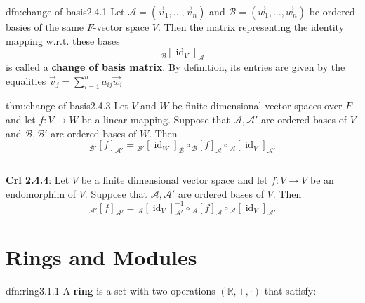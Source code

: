 \documentclass[landscape, 8pt]{extarticle}
\DeclareMathOperator{\id}{id}
\begin{document}
\begin{multicols}{3}
\begin{dfn}{dfn:change-of-basis}{2.4.1}
    Let $\mathcal{A} = (\vec{v}_{1},\dots,\vec{v}_{n})$ and $\mathcal{B} = (\vec{w}_{1},\dots,\vec{w}_{n})$ be ordered basies of the same $F$-vector space $V$. Then the matrix representing the identity mapping w.r.t. these bases
    \[{}_{\mathcal{B}}[\id_{V}]_{\mathcal{A}}\]
    is called a \textbf{change of basis matrix}. By definition, its entries are given by the equalities $\vec{v}_{j} = \sum_{i = 1}^{n} a_{ij}\vec{w}_{i}$
\end{dfn}

\begin{thm}{thm:change-of-basis}{2.4.3}
    Let $V$ and $W$ be finite dimensional vector spaces over $F$ and let $f : V \to W$ be a linear mapping. Suppose that $\mathcal{A}, \mathcal{A}'$ are ordered bases of $V$ and $\mathcal{B}, \mathcal{B}'$ are ordered bases of $W$. Then
    \[{}_{\mathcal{B}'}[f]_{\mathcal{A}'} = {}_{\mathcal{B}'}[\id_{W}]_{\mathcal{B}} \circ {}_{\mathcal{B}}[f]_{\mathcal{A}} \circ {}_{\mathcal{A}}[\id_{V}]_{\mathcal{A}'}\]

    \noindent\rule{\textwidth}{0.2pt}
    \textbf{Crl 2.4.4}: Let $V$ be a finite dimensional vector space and let $f : V \to V$ be an endomorphim of $V$. Suppose that $\mathcal{A}, \mathcal{A}'$ are ordered bases of $V$. Then
    \[{}_{\mathcal{A}'}[f]_{\mathcal{A}'} = {}_{\mathcal{A}}[\id_{V}]_{\mathcal{A}'}^{-1} \circ {}_{\mathcal{A}}[f]_{\mathcal{A}} \circ {}_{\mathcal{A}}[\id_{V}]_{\mathcal{A}'}\]
\end{thm}


\section{Rings and Modules}

\begin{dfn}{dfn:ring}{3.1.1}
    A \textbf{ring} is a set with two operations $(\mathbb{R}, +, \cdot)$ that satisfy:


\end{dfn}
\end{multicols}
\end{document}
